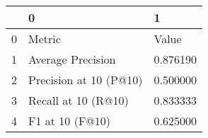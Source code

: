 \begin{tabular}{lll}
\toprule
 & 0 & 1 \\
\midrule
0 & Metric & Value \\
1 & Average Precision & 0.876190 \\
2 & Precision at 10 (P@10) & 0.500000 \\
3 & Recall at 10 (R@10) & 0.833333 \\
4 & F1 at 10 (F@10) & 0.625000 \\
\bottomrule
\end{tabular}
